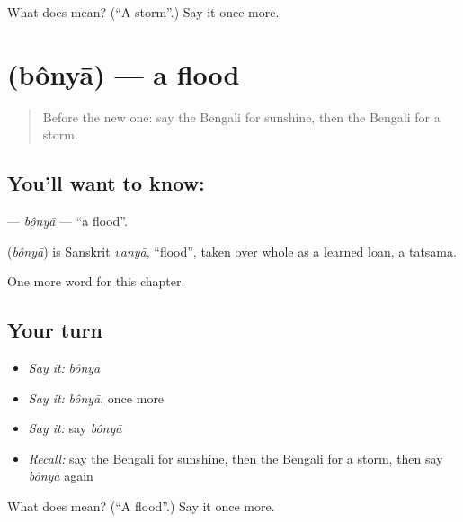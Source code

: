 \begin{tcolorbox}[breakable,colback=teal!4,colframe=teal!35!black,title={Before you move on}]
What does  mean? (\textquotedblleft{}A storm\textquotedblright{}.) Say it once more.
\end{tcolorbox}
\section[\texorpdfstring{\bn{বন্যা} (bônyā)}{বন্যা (bônyā)}]{ (bônyā) — a flood}

\label{lesson:BN-C255-bonya}



\begin{quote}
Before the new one: say the Bengali for sunshine, then the Bengali for a storm.
\end{quote}

\subsection*{You'll want to know: }
\textbf{} — \emph{bônyā} — \textquotedblleft{}a flood\textquotedblright{}.

\begin{cousinweb}
\textbf{} (\emph{bônyā}) is Sanskrit \emph{vanyā}, \textquotedblleft{}flood\textquotedblright{}, taken over whole as a learned loan, a tatsama.
\end{cousinweb}

\begin{grammarlens}[title={What you've built}]
One more word for this chapter.
\end{grammarlens}

\subsection*{Your turn}
\begin{itemize}
\raggedright
  \item \emph{Say it:} \emph{bônyā}
  \item \emph{Say it:} \emph{bônyā}, once more
  \item \emph{Say it:} say \emph{bônyā}
  \item \emph{Recall:} say the Bengali for sunshine, then the Bengali for a storm, then say \emph{bônyā} again
\end{itemize}

\begin{tcolorbox}[breakable,colback=teal!4,colframe=teal!35!black,title={Before you move on}]
What does  mean? (\textquotedblleft{}A flood\textquotedblright{}.) Say it once more.
\end{tcolorbox}
